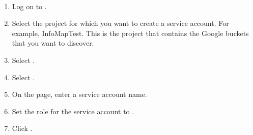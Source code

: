 \documentclass[letterpaper,10pt,english]{sphinxmanual}
\begin{document}
\paragraph{}
\label{\detokenize{mcdmp_app_ug:creating-a-service-account}}\label{\detokenize{mcdmp_app_ug:create-service-account}}
\begin{enumerate}
\item {} 
Log on to .

\item {} 
Select the project for which you want to create a service account. For example, InfoMapTest. This is the project that contains the Google buckets that you want to discover.

\begin{figure}[htbp]
\centering

\noindent{}
\end{figure}

\item {} 
Select .

\begin{figure}[htbp]
\centering

\noindent{}
\end{figure}

\item {} 
Select .

\item {} 
On the  page, enter a service account name.

\item {} 
Set the role for the service account to .

\begin{figure}[htbp]
\centering

\noindent{}
\end{figure}

\item {} 
Click .

\end{enumerate}
\end{document}

